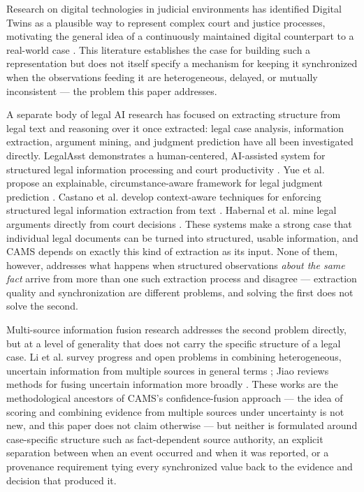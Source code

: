 \documentclass[conference]{IEEEtran}
\begin{document}
Research on digital technologies in judicial environments has identified
Digital Twins as a plausible way to represent complex court and justice
processes, motivating the general idea of a continuously maintained digital
counterpart to a real-world case \cite{bhatt2024}. This literature
establishes the case for building such a representation but does not itself
specify a mechanism for keeping it synchronized when the observations
feeding it are heterogeneous, delayed, or mutually inconsistent --- the
problem this paper addresses.

A separate body of legal AI research has focused on extracting structure
from legal text and reasoning over it once extracted: legal case analysis,
information extraction, argument mining, and judgment prediction have all
been investigated directly. LegalAsst demonstrates a human-centered,
AI-assisted system for structured legal information processing and court
productivity \cite{han2024}. Yue et al. propose an explainable,
circumstance-aware framework for legal judgment prediction \cite{yue2024}.
Castano et al. develop context-aware techniques for enforcing structured
legal information extraction from text \cite{castano2024}. Habernal et al.
mine legal arguments directly from court decisions \cite{habernal2024}.
These systems make a strong case that individual legal documents can be
turned into structured, usable information, and CAMS depends on exactly
this kind of extraction as its input. None of them, however, addresses what
happens when structured observations \emph{about the same fact} arrive from
more than one such extraction process and disagree --- extraction quality
and synchronization are different problems, and solving the first does not
solve the second.

Multi-source information fusion research addresses the second problem
directly, but at a level of generality that does not carry the specific
structure of a legal case. Li et al. survey progress and open problems in
combining heterogeneous, uncertain information from multiple sources in
general terms \cite{li2024}; Jiao reviews methods for fusing uncertain
information more broadly \cite{jiao2024}. These works are the
methodological ancestors of CAMS's confidence-fusion approach --- the idea
of scoring and combining evidence from multiple sources under uncertainty
is not new, and this paper does not claim otherwise --- but neither is
formulated around case-specific structure such as fact-dependent source
authority, an explicit separation between when an event occurred and when
it was reported, or a provenance requirement tying every synchronized value
back to the evidence and decision that produced it.
\end{document}
